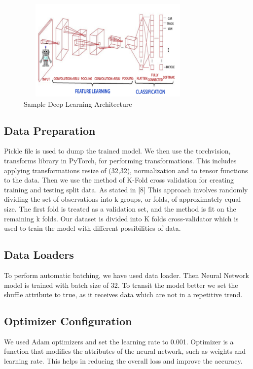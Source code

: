 \documentclass[conference]{IEEEtran}
\begin{document}
\begin{figure}[ht]
    \centering
    \includegraphics[width=9cm, height = 5cm]{Images/Deep Learning Architecture.png}
    \caption{Sample Deep Learning Architecture}
    \label{fig:Sample Deep Learning Architecture}
\end{figure}

\subsection{Data Preparation}
Pickle file is used to dump the trained model. We then use the torchvision, transforms library in PyTorch, for performing transformations. This includes applying transformations resize of (32,32), normalization and to tensor functions to the data. Then we use the method of K-Fold cross validation for creating training and testing split data. As stated in [8] This approach involves randomly dividing the set of observations into k groups, or folds, of approximately equal size. The first fold is treated as a validation set, and the method is fit on the remaining k folds. Our dataset is divided into K folds cross-validator which is used to train the model with different possibilities of data.

\subsection{Data Loaders}
To perform automatic batching, we have used data loader. Then Neural Network model is trained with batch size of 32. To transit the model better we set the shuffle attribute to true, as it receives data which are not in a repetitive trend.

\subsection{Optimizer Configuration}
We used Adam optimizers and set the learning rate to 0.001. Optimizer is a function that modifies the attributes of the neural network, such as weights and learning rate. This helps in reducing the overall loss and improve the accuracy.
\end{document}
